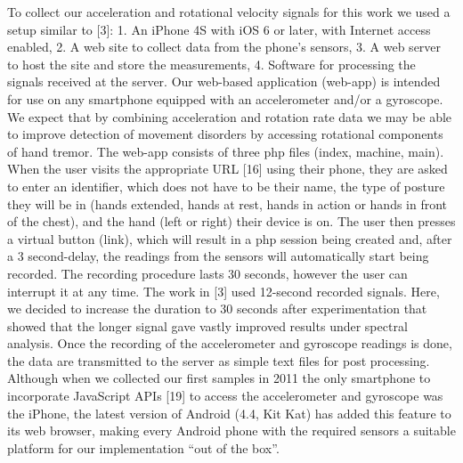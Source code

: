 To collect our acceleration and rotational velocity signals for this work we used a setup similar to [3]:
1.	An iPhone 4S with iOS 6 or later, with Internet access enabled,
2.	A web site to collect data from the phone’s sensors,
3.	A web server to host the site and store the measurements,
4.	Software for processing the signals received at the server.
Our web-based application (web-app) is intended for use on any smartphone equipped with an accelerometer and/or a gyroscope. We expect that by combining acceleration and rotation rate data we may be able to improve detection of movement disorders by accessing rotational components of hand tremor. 
The web-app consists of three php files (index, machine, main). When the user visits the appropriate URL [16] using their phone, they are asked to enter an identifier, which does not have to be their name, the type of posture they will be in (hands extended, hands at rest, hands in action or hands in front of the chest), and the hand (left or right) their device is on. The user then presses a virtual button (link), which will result in a php session being created and, after a 3 second-delay, the readings from the sensors will automatically start being recorded. The recording procedure lasts 30 seconds, however the user can interrupt it at any time. The work in [3] used 12-second recorded signals. Here, we decided to increase the duration to 30 seconds after experimentation that showed that the longer signal gave vastly improved results under spectral analysis. Once the recording of the accelerometer and gyroscope readings is done, the data are transmitted to the server as simple text files for post processing. 
Although when we collected our first samples in 2011 the only smartphone to incorporate JavaScript APIs [19] to access the accelerometer and gyroscope was the iPhone, the latest version of Android (4.4, Kit Kat) has added this feature to its web browser, making every Android phone with the required sensors a suitable platform for our implementation “out of the box”. 

